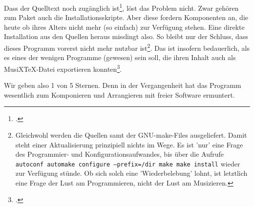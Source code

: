 Dass der Quelltext noch zugänglich
ist\footcite[vgl.][\nopage wp.]{NoteeditRep2014a}, löst das Problem nicht. Zwar
gehören zum Paket auch die Installationsskripte. Aber diese fordern Komponenten an,
die heute ob ihres Alters nicht mehr (so einfach) zur Verfügung stehen. Eine
direkte Installation aus den Quellen heraus misslingt also. So bleibt nur der
Schluss, dass dieses Programm vorerst nicht mehr nutzbar ist\footnote{Gleichwohl
werden die Quellen samt der GNU-make-Files ausgeliefert. Damit steht einer
Aktualisierung prinzipiell nichts im Wege. Es ist 'nur' eine Frage des
Programmier- und Konfigurationsaufwandes, bis  über die Aufrufe
\texttt{autoconf automake configure --prefix=/dir make make install} wieder zur
Verfügung stünde. Ob sich solch eine 'Wiederbelebung' lohnt, ist letztlich eine
Frage der Lust am Programmieren, nicht der Lust am Musizieren. }. Das ist
insofern bedauerlich, als es eines der wenigen Programme (gewesen) sein soll,
die ihren Inhalt auch als MusiX\TeX-Datei exportieren
konnten\footcite[vgl.][\nopage wp.]{Roitman2007a}.

Wir geben  also 1 von 5 Sternen. Denn in der Vergangenheit hat das
Programm wesentlich zum Komponieren und Arrangieren mit freier Software
ermuntert.


%

